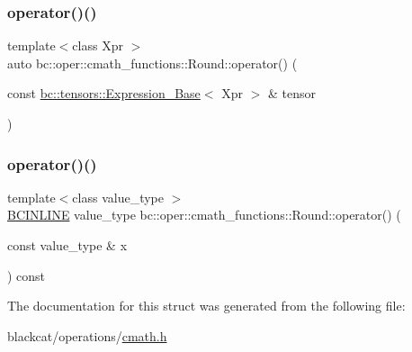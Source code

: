 \mbox{\label{structbc_1_1oper_1_1cmath__functions_1_1Round_ab2696f8d599070a885c91740925331ce}} 
\subsubsection{\texorpdfstring{operator()()}{operator()()}\hspace{0.1cm}{\footnotesize\ttfamily [2/3]}}
{\footnotesize\ttfamily template$<$class Xpr $>$ \\
auto bc\+::oper\+::cmath\+\_\+functions\+::\+Round\+::operator() (\begin{DoxyParamCaption}\item[{const \hyperlink{classbc_1_1tensors_1_1Expression__Base}{bc\+::tensors\+::\+Expression\+\_\+\+Base}$<$ Xpr $>$ \&}]{tensor }\end{DoxyParamCaption})\hspace{0.3cm}{\ttfamily [inline]}}

\mbox{\label{structbc_1_1oper_1_1cmath__functions_1_1Round_aa18b888f206639ede574b6707188f85a}} 
\subsubsection{\texorpdfstring{operator()()}{operator()()}\hspace{0.1cm}{\footnotesize\ttfamily [3/3]}}
{\footnotesize\ttfamily template$<$class value\+\_\+type $>$ \\
\hyperlink{common_8h_a6699e8b0449da5c0fafb878e59c1d4b1}{B\+C\+I\+N\+L\+I\+NE} value\+\_\+type bc\+::oper\+::cmath\+\_\+functions\+::\+Round\+::operator() (\begin{DoxyParamCaption}\item[{const value\+\_\+type \&}]{x }\end{DoxyParamCaption}) const\hspace{0.3cm}{\ttfamily [inline]}}



The documentation for this struct was generated from the following file\+:\begin{DoxyCompactItemize}
\item 
blackcat/operations/\hyperlink{cmath_8h}{cmath.\+h}\end{DoxyCompactItemize}
